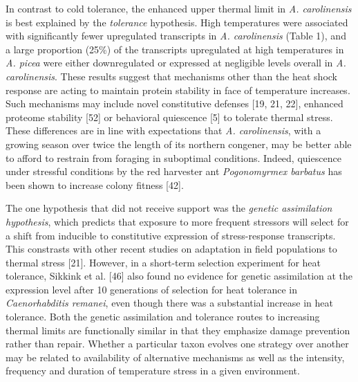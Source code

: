 \documentclass[]{article}
\begin{document}
In contrast to cold tolerance, the enhanced upper thermal limit in
\emph{A. carolinensis} is best explained by the \emph{tolerance}
hypothesis. High temperatures were associated with significantly fewer
upregulated transcripts in \emph{A. carolinensis} (Table 1), and a large
proportion (25\%) of the transcripts upregulated at high temperatures in
\emph{A. picea} were either downregulated or expressed at negligible
levels overall in \emph{A. carolinensis}. These results suggest that
mechanisms other than the heat shock response are acting to maintain
protein stability in face of temperature increases. Such mechanisms may
include novel constitutive defenses {[}19, 21, 22{]}, enhanced proteome
stability {[}52{]} or behavioral quiescence {[}5{]} to tolerate thermal
stress. These differences are in line with expectations that \emph{A.
carolinensis}, with a growing season over twice the length of its
northern congener, may be better able to afford to restrain from
foraging in suboptimal conditions. Indeed, quiescence under stressful
conditions by the red harvester ant \emph{Pogonomyrmex barbatus} has
been shown to increase colony fitness {[}42{]}.

The one hypothesis that did not receive support was the \emph{genetic
assimilation hypothesis}, which predicts that exposure to more frequent
stressors will select for a shift from inducible to constitutive
expression of stress-response transcripts. This constrasts with other
recent studies on adaptation in field populations to thermal stress
{[}21{]}. However, in a short-term selection experiment for heat
tolerance, Sikkink et al. {[}46{]} also found no evidence for genetic
assimilation at the expression level after 10 generations of selection
for heat tolerance in \emph{Caenorhabditis remanei}, even though there
was a substantial increase in heat tolerance. Both the genetic
assimilation and tolerance routes to increasing thermal limits are
functionally similar in that they emphasize damage prevention rather
than repair. Whether a particular taxon evolves one strategy over
another may be related to availability of alternative mechanisms as well
as the intensity, frequency and duration of temperature stress in a
given environment.
\end{document}
